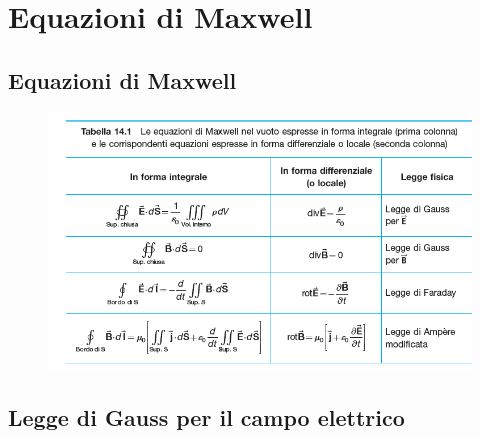 \section{Equazioni di Maxwell}

\subsection{Equazioni di Maxwell}
\begin{figure}[H]
    \centering
    \includegraphics[width=0.8\linewidth]{imgs/20 - maxwell.png}
\end{figure}

\subsection{Legge di Gauss per il campo elettrico}
